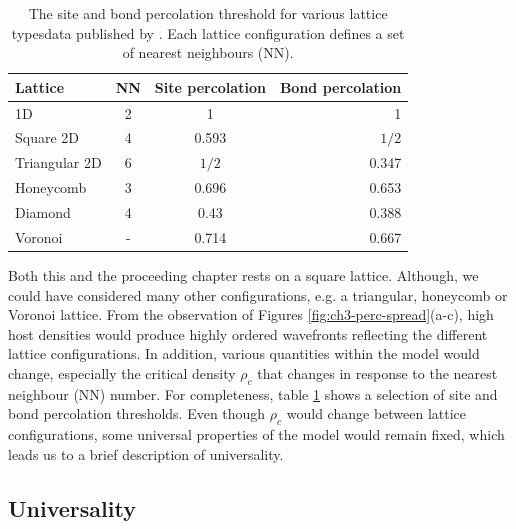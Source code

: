 \begin{table}[h!]
  \begin{center}
    \begin{tabular}{l|c|c|r} %
    \hline
      \textbf{Lattice} & NN & \textbf{Site percolation} & \textbf{Bond percolation}\\
      \hline
      1D & 2 & 1 & 1\\
      Square 2D & 4 & 0.593 & $1/2$\\
      Triangular 2D & 6 & $1/2$ & 0.347\\
      Honeycomb & 3 & 0.696 & 0.653\\
      Diamond & 4 & 0.43 & 0.388\\
      Voronoi & - & 0.714 & 0.667\\
    \hline
    \end{tabular}
    \caption{The site and bond percolation threshold for various lattice types\textemdash data published by \cite{stauffer2018introduction, PhysRevE.80.041101}.
            Each lattice configuration defines a set of nearest neighbours (NN).
    }
    \label{tab:perc}
  \end{center}
\end{table}

Both this and the proceeding chapter rests on a square lattice.
Although, we could have considered many other configurations, e.g. a triangular, honeycomb or Voronoi lattice.
From the observation of Figures \ref{fig:ch3-perc-spread}(a-c),
high host densities would produce highly ordered wavefronts reflecting the different lattice configurations.
In addition, various quantities within the model would change, especially the critical density $\rho_c$ that changes in response to the nearest neighbour (NN) number.
For completeness, table \ref{tab:perc} shows a selection of site and bond percolation thresholds.
Even though $\rho_c$ would change between lattice configurations, some universal properties of the model would remain fixed, 
which leads us to a brief description of universality.


\subsection{Universality}

